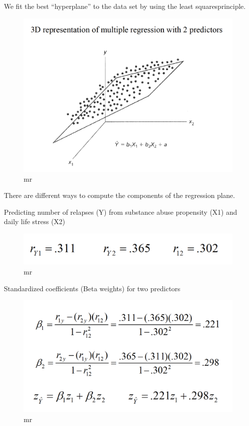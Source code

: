 \documentclass[]{book}
\theoremstyle{definition}
\theoremstyle{definition}
\theoremstyle{definition}
\theoremstyle{remark}
\begin{document}
We fit the best ``hyperplane'' to the data set by using the least
squaresprinciple.

\begin{figure}
\centering
\includegraphics{img/hicksmr2.png}
\caption{mr}
\end{figure}

There are different ways to compute the components of the regression
plane.

Predicting number of relapses (Y) from substance abuse propensity (X1)
and daily life stress (X2)

\begin{figure}
\centering
\includegraphics{img/hicksmr3.png}
\caption{mr}
\end{figure}

Standardized coefficients (Beta weights) for two predictors

\begin{figure}
\centering
\includegraphics{img/hicksmr4.png}
\caption{mr}
\end{figure}
\end{document}
